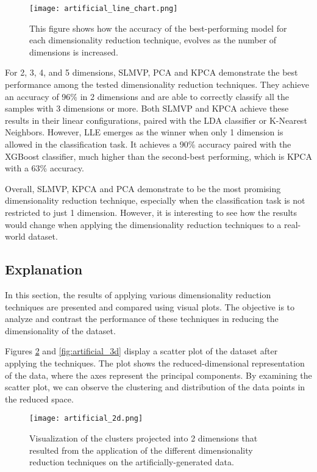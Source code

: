 \begin{figure}[!ht]
    \centering
    \texttt{[image: artificial\_line\_chart.png]}
    \caption{This figure shows how the accuracy of the best-performing model for each dimensionality reduction technique, evolves as the number of dimensions is increased.}
    \label{fig:art_line_chart}
\end{figure}

For 2, 3, 4, and 5 dimensions, SLMVP, PCA and KPCA demonstrate the best performance among the tested dimensionality reduction techniques. They achieve an accuracy of 96\% in 2 dimensions and are able to correctly classify all the samples with 3 dimensions or more. Both SLMVP and KPCA achieve these results in their linear configurations, paired with the LDA classifier or K-Nearest Neighbors.
However, LLE emerges as the winner when only 1 dimension is allowed in the classification task. It achieves a 90\% accuracy paired with the XGBoost classifier, much higher than the second-best performing, which is KPCA with a 63\% accuracy.

Overall, SLMVP, KPCA and PCA demonstrate to be the most promising dimensionality reduction technique, especially when the classification task is not restricted to just 1 dimension. However, it is interesting to see how the results would change when applying the dimensionality reduction techniques to a real-world dataset.

\subsection{Explanation}

In this section, the results of applying various dimensionality reduction techniques are presented and compared using visual plots. The objective is to analyze and contrast the performance of these techniques in reducing the dimensionality of the dataset.

Figures \ref{fig:artificial_2d} and \ref{fig:artificial_3d} display a scatter plot of the dataset after applying the techniques. The plot shows the reduced-dimensional representation of the data, where the axes represent the principal components. By examining the scatter plot, we can observe the clustering and distribution of the data points in the reduced space.

\begin{figure}[!ht]
    \centering
    \texttt{[image: artificial\_2d.png]}
    \caption{Visualization of the clusters projected into 2 dimensions that resulted from the application of the different dimensionality reduction techniques on the artificially-generated data.}
    \label{fig:artificial_2d}
\end{figure}

